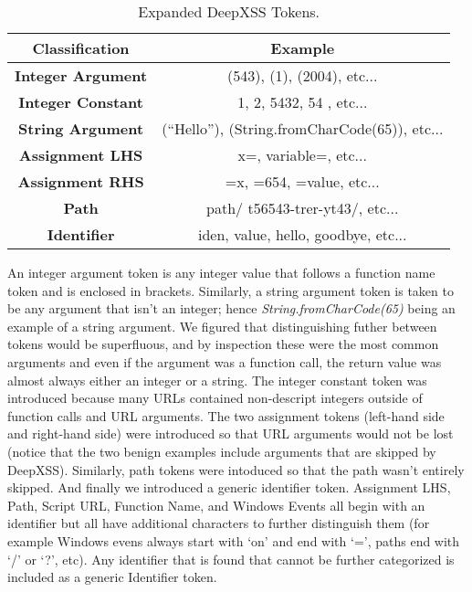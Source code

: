 \begin{table}
\begin{center}
\begin{tabular}{||c | c||} 
    \hline
    Classification & Example \\ [0.5ex] 
    \hline\hline
    \textbf{Integer Argument} &  (543), (1), (2004), etc... \\ 
    \hline
    \textbf{Integer Constant} &  1, 2, 5432, 54 , etc... \\ 
    \hline
    \textbf{String Argument} & (``Hello''), (String.fromCharCode(65)), etc... \\
    \hline
    \textbf{Assignment LHS} & x=, variable=, etc... \\
    \hline
    \textbf{Assignment RHS} & =x, =654, =value, etc... \\
    \hline
    \textbf{Path} & path/ t56543-trer-yt43/, etc... \\ 
    \hline
    \textbf{Identifier} & iden, value, hello, goodbye, etc... \\ [1ex] 
    \hline
\end{tabular}
\caption{\label{exp:tok:tab}Expanded DeepXSS Tokens.}
\end{center}
\end{table}

An integer argument token is any integer value that follows a function name token and is enclosed in brackets. Similarly, a string argument token is taken to be any argument that isn't an integer; hence \textit{String.fromCharCode(65)} being an example of a string argument. We figured that distinguishing futher between tokens would be superfluous, and by inspection these were the most common arguments and even if the argument was a function call, the return value was almost always either an integer or a string. The integer constant token was introduced because many URLs contained non-descript integers outside of function calls and URL arguments. The two assignment tokens (left-hand side and right-hand side) were introduced so that URL arguments would not be lost (notice that the two benign examples include arguments that are skipped by DeepXSS). Similarly, path tokens were intoduced so that the path wasn't entirely skipped. And finally we introduced a generic identifier token. Assignment LHS, Path, Script URL, Function Name, and Windows Events all begin with an identifier but all have additional characters to further distinguish them (for example Windows evens always start with `on' and end with `=', paths end with `/' or `?', etc). Any identifier that is found that cannot be further categorized is included as a generic Identifier token.

